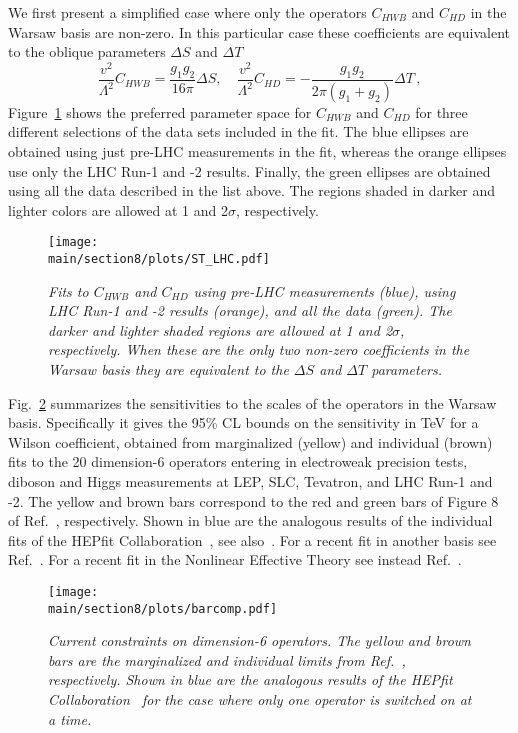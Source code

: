 \documentclass[../report.tex]{subfiles}
\providecommand{\main}{..}
\begin{document}
We first present a simplified case where only the operators $C_{HWB}$ and $C_{HD}$ in the Warsaw basis are non-zero.
In this particular case these coefficients are equivalent to the oblique parameters $\Delta S$ and $\Delta T$~\cite{Grinstein:1991cd}
\begin{equation}
\frac{v^2}{\Lambda^2} C_{HWB} = \frac{g_1 g_2}{16 \pi} \Delta S, \quad \frac{v^2}{\Lambda^2} C_{HD} = - \frac{g_1 g_2}{2 \pi \left(g_1 + g_2\right)} \Delta T \, ,
\end{equation}
Figure~\ref{fig8:SandT} shows the preferred parameter space for 
$C_{HWB}$ and $C_{HD}$ for three different selections of the data sets included in the fit.
The blue ellipses are obtained using just pre-LHC measurements in the fit, 
whereas the orange ellipses use only the LHC Run-1 and -2 results.
Finally, the green ellipses are obtained using all the data described in the list above.
The regions shaded in darker and lighter colors are allowed at 1 and 2$\sigma$, respectively. 
\begin{figure}[t!]
  \centering
\texttt{[image: \\main/section8/plots/ST\_LHC.pdf]}
 \caption{\it Fits to $C_{HWB}$ and $C_{HD}$ using pre-LHC measurements (blue), using LHC Run-1 and -2 results (orange), and all the data (green). The darker and lighter shaded regions are allowed at 1 and 2$\sigma$, respectively. When these are the only two non-zero coefficients in the Warsaw basis they are equivalent to the $\Delta S$ and $\Delta T$ parameters. }
   \label{fig8:SandT}
\end{figure}

Fig.~\ref{fig8:HEPfitvsEMSY} summarizes the sensitivities to the scales of the operators in the Warsaw basis.
Specifically it gives the 95\% CL bounds on the sensitivity in TeV for a Wilson coefficient, obtained from marginalized (yellow) and individual (brown) fits to the 20 dimension-6 operators entering in electroweak precision tests, diboson and Higgs measurements at LEP, SLC, Tevatron, and LHC Run-1 and -2.
The yellow and brown bars correspond to the red and green bars of Figure 8 of Ref.~\cite{Ellis:2018gqa}, respectively.
Shown in blue are the analogous results of the individual fits of the HEPfit Collaboration~\cite{Ciuchini:2013pca, deBlas:2016ojx}, see also~\cite{luca:talk, otto:talk}.
For a recent fit in another basis see Ref.~\cite{Alves:2018nof}.
For a recent fit in the Nonlinear Effective Theory see instead Ref.~\cite{deBlas:2018tjm}.
\begin{figure}
  \centering
\texttt{[image: \\main/section8/plots/barcomp.pdf]}
 \caption{\it Current constraints on dimension-6 operators. The yellow and brown bars are the marginalized and individual limits from Ref.~\cite{Ellis:2018gqa}, respectively. Shown in blue are the analogous results of the HEPfit Collaboration~\cite{Ciuchini:2013pca, deBlas:2016ojx} for the case where only one operator is switched on at a time.}
   \label{fig8:HEPfitvsEMSY}
\end{figure} 
\end{document}
